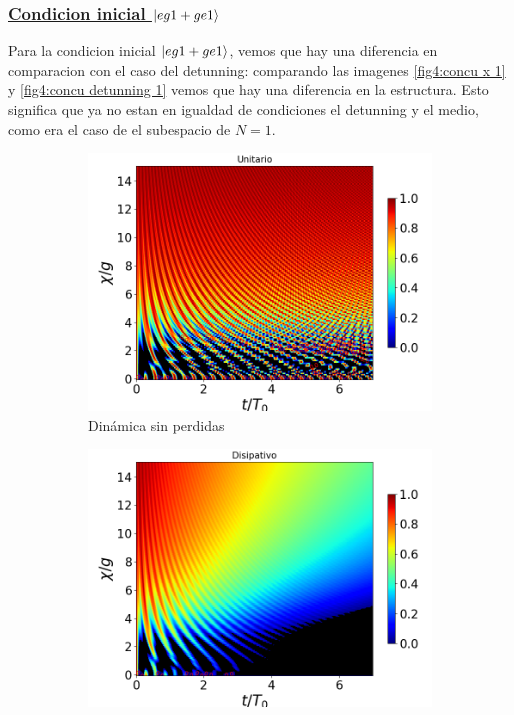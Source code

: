 \subsubsection{\underline{Condicion inicial $\ket{eg1+ge1}$}}
Para la condicion inicial $\ket{eg1+ge1}$, vemos que hay una diferencia en comparacion con el caso del detunning: comparando las imagenes \ref{fig4:concu x 1} y \ref{fig4:concu detunning 1} vemos que hay una diferencia en la estructura. Esto significa que ya no estan en igualdad de condiciones el detunning y el medio, como era el caso de el subespacio de $N=1$.
\begin{figure}[h!]
    \centering
    \begin{subfigure}{0.49\textwidth}
        \includegraphics[width=\textwidth]{figuras/ch4/concu/chi/eg1+ge1 d=0.0g k=0.0g J=0.0g gamma=0.25g concu chi uni.png}
        \caption{Dinámica sin perdidas}
        \label{fig4:concu x 1 uni}
    \end{subfigure}
    \hfill
    \begin{subfigure}{0.49\textwidth}
        \includegraphics[width=\textwidth]{figuras/ch4/concu/chi/eg1+ge1 d=0.0g k=0.0g J=0.0g gamma=0.25g concu chi dis.png}

\end{subfigure}
\end{figure}
